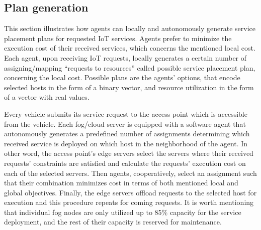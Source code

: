 \documentclass[twocolumn]{article}
\begin{document}
\subsection{Plan generation}
\par This section illustrates how agents can locally and autonomously generate service placement plans for requested
IoT services. Agents prefer to minimize the execution cost of their received services, which concerns the mentioned local cost. Each agent, upon receiving IoT requests, locally generates a certain number of assigning/mapping ``requests to
resources'' called possible service placement plan, concerning the local cost. 
Possible plans are the agents' options, that encode selected hosts in the form of a binary vector, and resource utilization in the form of a vector with real values.
\par Every vehicle submits its service request to the access point which is accessible from the vehicle.
Each fog/cloud server is equipped with a software agent that autonomously generates a predefined number of assignments determining which received service is deployed on which host in the neighborhood of the agent. In other word, the access point's edge servers select the servers where their received requests' constraints are satisfied and calculate the requests' execution cost on each of the selected servers. Then agents, cooperatively, select an assignment such that their combination minimizes cost in terms of both mentioned local and global objectives.
Finally, the edge servers offload requests to the selected host for execution and this procedure repeats for coming requests. It is worth mentioning that individual fog nodes are only utilized up to 85\% capacity for the service deployment, and the rest of their capacity is reserved for maintenance.
\end{document}
